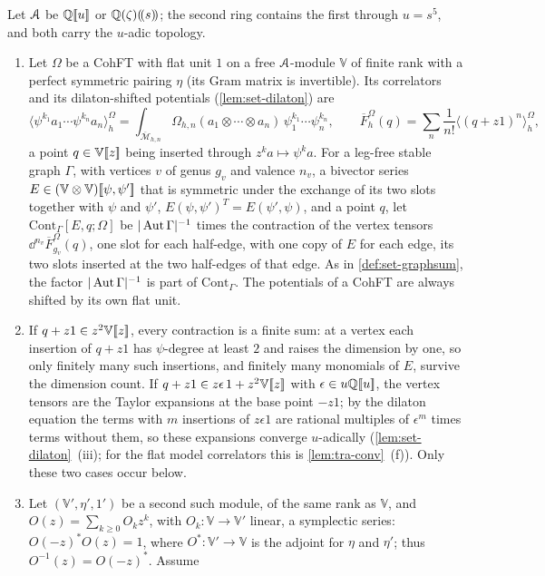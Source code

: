 \begin{defn}
\label{def:flh-outer}
Let $\mathcal{A}$ be $\mathbb{Q}[\![ u ]\!]$ or $\mathbb{Q}(\zeta)(\!(s)\!)$; the second ring contains the first through $u=s^5$, and both carry the $u$-adic topology.
\begin{enumerate}
\item Let $\Omega$ be a CohFT with flat unit $1$ \cite[Def.~0.3]{PPZ15} on a free $\mathcal{A}$-module $\mathbb V$ of finite rank with a perfect symmetric pairing $\eta$ (its Gram matrix is invertible). Its correlators and its dilaton-shifted potentials (\cref{lem:set-dilaton}) are
\[
\langle\psi^{k_1}a_1\cdots\psi^{k_n}a_n\rangle^{\Omega}_h=\int_{\overline{\mathcal M}_{h,n}}\Omega_{h,n}(a_1\otimes\cdots\otimes a_n)\,\psi_1^{k_1}\cdots\psi_n^{k_n},\qquad\overline F^{\Omega}_h(q)=\sum_{n}\frac{1}{n!}\langle(q+z1)^n\rangle^{\Omega}_h ,
\]
a point $q\in\mathbb V[\![ z ]\!]$ being inserted through $z^ka\mapsto\psi^ka$. For a leg-free stable graph $\Gamma$, with vertices $v$ of genus $g_v$ and valence $n_v$, a bivector series $E\in(\mathbb V\otimes\mathbb V)[\![ \psi,\psi' ]\!]$ that is symmetric under the exchange of its two slots together with $\psi$ and $\psi'$, $E(\psi,\psi')^T=E(\psi',\psi)$, and a point $q$, let $\mathrm{Cont}_\Gamma[E,q;\Omega]$ be $|\operatorname{Aut}\Gamma|^{-1}$ times the contraction of the vertex tensors $\dd^{n_v}\overline F^{\Omega}_{g_v}(q)$, one slot for each half-edge, with one copy of $E$ for each edge, its two slots inserted at the two half-edges of that edge. As in \cref{def:set-graphsum}, the factor $|\operatorname{Aut}\Gamma|^{-1}$ is part of $\mathrm{Cont}_\Gamma$. The potentials of a CohFT are always shifted by its own flat unit.
\item If $q+z1\in z^2\mathbb V[\![ z ]\!]$, every contraction is a finite sum: at a vertex each insertion of $q+z1$ has $\psi$-degree at least $2$ and raises the dimension by one, so only finitely many such insertions, and finitely many monomials of $E$, survive the dimension count. If $q+z1\in z\epsilon\,1+z^2\mathbb V[\![ z ]\!]$ with $\epsilon\in u\mathbb{Q}[\![ u ]\!]$, the vertex tensors are the Taylor expansions at the base point $-z1$; by the dilaton equation the terms with $m$ insertions of $z\epsilon 1$ are rational multiples of $\epsilon^m$ times terms without them, so these expansions converge $u$-adically (\cref{lem:set-dilaton}~(iii); for the flat model correlators this is \cref{lem:tra-conv}~(f)). Only these two cases occur below.
\item Let $(\mathbb V',\eta',1')$ be a second such module, of the same rank as $\mathbb V$, and $O(z)=\sum_{k\geq0}O_kz^k$, with $O_k\colon\mathbb V\to\mathbb V'$ linear, a symplectic series: $O(-z)^*O(z)=1$, where $O^*\colon\mathbb V'\to\mathbb V$ is the adjoint for $\eta$ and $\eta'$; thus $O^{-1}(z)=O(-z)^*$. Assume

\end{enumerate}
\end{defn}
